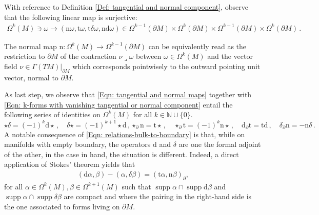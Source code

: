 \begin{remark}\label{Rmk: surjectivity of t,n,tdelta,nd}
	With reference to Definition \ref{Def: tangential and normal component}, observe that the following linear map is surjective:
	\begin{align*}
	\Omega^k(M)\ni\omega\to(\mathrm{n}\omega,\mathrm{t}\omega,\mathrm{t}\delta\omega,\mathrm{nd}\omega)\in
	\Omega^{k-1}(\partial M)\times
	\Omega^k(\partial M)\times
	\Omega^{k-1}(\partial M)\times
	\Omega^k(\partial M)\,.
	\end{align*}
\end{remark}

\begin{remark}
	The normal map $\mathrm{n}:\Omega^k(M)\to\Omega^{k-1}(\partial M)$ can be equivalently read as the restriction to $\partial M$ of the contraction $\nu\operatorname{\lrcorner}\omega$ between $\omega\in\Omega^k(M)$ and the vector field $\nu\in\Gamma(TM)|_{\partial M}$ which corresponds pointwisely to the outward pointing unit vector, normal to $\partial M$.
\end{remark}

\noindent As last step, we observe that \eqref{Eqn: tangential and normal maps} together with \eqref{Eqn: k-forms with vanishing tangential or normal component} entail the following series of identities on $\Omega^k(M)$ for all $k\in\mathbb{N}\cup\{0\}$.
\begin{subequations}\label{Eqn: relations between d,delta,t,n}
	\begin{equation}\label{Eqn: relations-bulk}
	\star\delta=(-1)^k\mathrm{d}\star\,,\quad
	\delta\star=(-1)^{k+1}\star\mathrm{d}\,,
	\end{equation}
	\begin{equation}\label{Eqn: relations-bulk-to-boundary}
	\star_\partial\mathrm{n}=\mathrm{t}\star\,,\quad
	\star_\partial\mathrm{t}=(-1)^k\mathrm{n}\star\,,\quad
	\mathrm{d}_\partial\mathrm{t}=\mathrm{t}\mathrm{d}\,,\quad
	\delta_\partial\mathrm{n}=-\mathrm{n}\delta\,.
	\end{equation}
\end{subequations}
A notable consequence of \eqref{Eqn: relations-bulk-to-boundary} is that, while on manifolds with empty boundary, the operators $\mathrm{d}$ and $\delta$ are one the formal adjoint of the other, in the case in hand, the situation is different. Indeed, a direct application of Stokes' theorem yields that 
\begin{align}\label{Eqn: boundary terms for delta and d}
(\mathrm{d}\alpha,\beta)-(\alpha,\delta\beta)=
(\mathrm{t}\alpha,\mathrm{n}\beta)_\partial,
\end{align}
for all $\alpha\in\Omega^k(M),\beta\in\Omega^{k+1}(M)$ such that $\operatorname{supp}\alpha\cap\operatorname{supp}\mathrm{d}\beta$ and $\operatorname{supp}\alpha\cap\operatorname{supp}\delta\beta$ are compact and where the pairing in the right-hand side is the one associated to forms living on $\partial M$.


